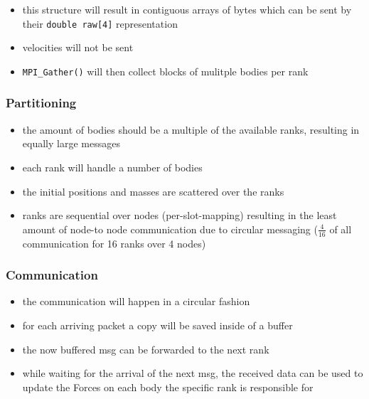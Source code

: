 \documentclass[]{scrartcl}
\begin{document}
\begin{itemize}
  \item this structure will result in contiguous arrays of bytes which can be sent by their \verb|double raw[4]| representation
  \item velocities will not be sent
  \item \verb|MPI_Gather()| will then collect blocks of mulitple bodies per rank
\end{itemize}

\subsubsection{Partitioning}

\begin{itemize}
  \item the amount of bodies should be a multiple of the available ranks, resulting in equally large messages
  \item each rank will handle a number of bodies
  \item the initial positions and masses are scattered over the ranks
  \item ranks are sequential over nodes (per-slot-mapping) resulting in the least amount of node-to node communication due to circular messaging ($\frac{4}{16}$ of all communication for 16 ranks over 4 nodes)
\end{itemize}

\subsubsection{Communication}
\begin{itemize}
  \item the communication will happen in  a circular fashion
  \item for each arriving packet a copy will be saved inside of a buffer
  \item the now buffered msg can be forwarded to the next rank
  \item while waiting for the arrival of the next msg, the received data can be used to update the Forces on each body the specific rank is responsible for
\end{itemize}
\end{document}
